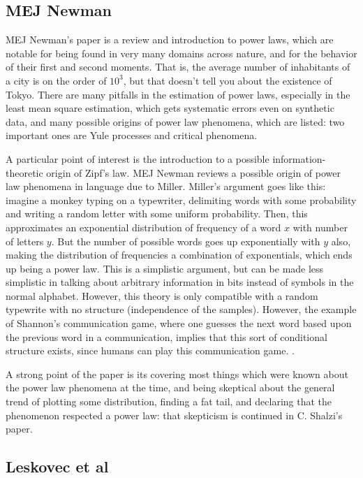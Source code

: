\documentclass[12pt]{article}
\begin{document}
\subsection{MEJ Newman}

MEJ Newman's paper is a review and introduction to power laws, which are notable for being found in very many domains across nature, and for the behavior of their first and second moments. That is, the average number of inhabitants of a city is on the order of $10^3$, but that doesn't tell you about the existence of Tokyo. There are many pitfalls in the estimation of power laws, especially in the least mean square estimation, which gets systematic errors even on synthetic data, and many possible origins of power law phenomena, which are listed: two important ones are Yule processes and critical phenomena.

A particular point of interest is the introduction to a possible information-theoretic origin of Zipf's law. MEJ Newman reviews a possible origin of power law phenomena in language due to Miller\cite{gamiller}. Miller's argument goes like this: imagine a monkey typing on a typewriter, delimiting words with some probability and writing a random letter with some uniform probability. Then, this approximates an exponential distribution of frequency of a word $x$ with number of letters $y$. But the number of possible words goes up exponentially with $y$ also, making the distribution of frequencies a combination of exponentials, which ends up being a power law. This is a simplistic argument, but can be made less simplistic in talking about arbitrary information in bits instead of symbols in the normal alphabet. However, this theory is only compatible with a random typewrite with no structure (independence of the samples). However, the example of Shannon's communication game, where one guesses the next word based upon the previous word in a communication, implies that this sort of conditional structure exists, since humans can play this communication game. %
. 

A strong point of the paper is its covering most things which were known about the power law phenomena at the time, and being skeptical about the general trend of plotting some distribution, finding a fat tail, and declaring that the phenomenon respected a power law: that skepticism is continued in C. Shalzi's paper\cite{cosma}.

\subsection{Leskovec et al}
\end{document}
